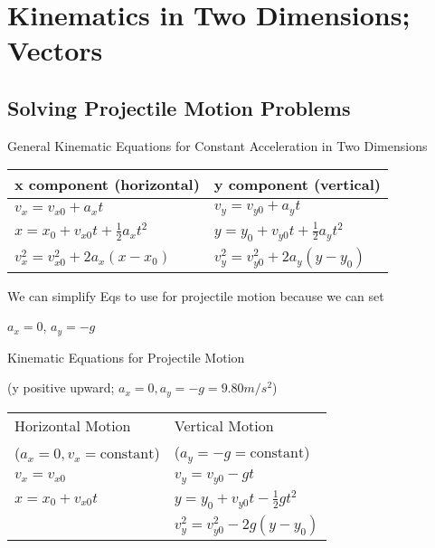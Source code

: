 \documentclass{extarticle}
\begin{document}
    
    
    
    
    
    
    
    
\section{Kinematics in
Two Dimensions; Vectors}
    
    
\subsection{Solving Projectile Motion Problems}

General Kinematic Equations for Constant Acceleration
in Two Dimensions


\begin{tabu}{XX}
x component (horizontal) & 
y component (vertical) \\
\hline
$v_x = v_{x0} + a_xt$ &
$v_y = v_{y0} + a_yt$ \\

$x = x_0 + v_{x0}t + \frac{1}{2}a_xt^2$ & 
$y = y_0 + v_{y0}t + \frac{1}{2}a_yt^2$ \\

$v_x^2 = v_{x0}^2 + 2a_x(x - x_0)$ & 
$v_y^2 = v_{y0}^2 + 2a_y(y - y_0)$ \\ \hline
\end{tabu}



We can simplify Eqs to use for projectile motion because we can set

$a_x = 0$, $a_y = -g$


Kinematic Equations for Projectile Motion

(y positive upward; $a_x = 0, a_y = -g = 9.80 m/s^2$)




\begin{tabu}{XX}
Horizontal Motion & 
Vertical Motion \\
($a_x = 0, v_x = \text{constant}$) &
($a_y = -g = \text{constant}$) \\
\hline
$v_x = v_{x0}$ &
$v_y = v_{y0} - gt$ \\

$x = x_0 + v_{x0}t $ & 
$y = y_0 + v_{y0}t - \frac{1}{2}gt^2$ \\

 & 
$v_y^2 = v_{y0}^2 - 2g(y - y_0)$ \\ \hline
\end{tabu}
\end{document}
